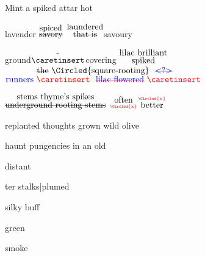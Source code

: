\documentclass[a4paper]{article}
\begin{document}
\begin{minipage}[t]{0.85\textwidth}
\draft
\vspace{0.1in}
Mint a spiked attar hot\par 
lavender $\stackrel{\hbox{spiced}}{\hbox{\st{savory}}}$ $\stackrel{\hbox{laundered}}{\hbox{\st{that is}}}$savoury \raisebox{0.5em}{purpled}\par
{}
ground$\stackrel{\hbox{-}}{\hbox{$\caretinsert$}}$covering \color{red}\Circled{\color{blue}{3}} $\stackrel{\hbox{lilac brilliant}}{\hbox{spiked}}$
$\stackrel{\hbox{\st{the} \Circled{square-rooting} 
\color{blue}
\setstcolor{blue}
\st{<?>}}}
{\hbox{\color{blue}{runners}
\color{red}{$\caretinsert$}
\setstcolor{red}
\color{blue}{\st{lilac flowered}}
\color{red}{$\caretinsert$}
}}$\par
{}
\color{blue} $\stackrel{\hbox{stems thyme's spikes}}{\hbox{\st{underground rooting stems}}}$ $\stackrel{\hbox{often}}{\hbox{\tiny \color{red}\Circled{x}}}$$\stackrel{\hbox{\tiny \color{red}\Circled{x}}}{\hbox{better}}$\par
{}
replanted thoughts grown wild olive\par
haunt pungencies in an old \hfill  \tiny 
\begin{turn}{90}\hspace{0.1in}distant\par\end{turn}
\begin{turn}{90}ter stalks\footnotesize{|}\tiny plumed\par\end{turn}
\begin{turn}{90}\hspace{0.1in}silky buff\par\end{turn}
\begin{turn}{90}\hspace{0.2in}green\par\end{turn}
\begin{turn}{90}\hspace{0.2in}smoke\par\end{turn}\par
\small
{}$$
\end{minipage}
\end{document}
